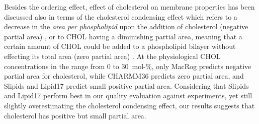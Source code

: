 \documentclass[journal=jctcce]{achemso}
\begin{document}
Besides the ordering effect, effect of cholesterol on membrane properties has been discussed also in terms of the cholesterol condensing effect which 
refers to a decrease in the \emph{area per phospholipid} upon the addition of cholesterol (negative partial area) \cite{edholm2005areas}, or to CHOL having a diminishing partial area, meaning that a certain amount of CHOL could be added to a phospholipid bilayer without effecting its total area (zero partial area) \cite{javanainen2017two}. 
At the physiological CHOL concentrations in the range from 0 to 30~mol-\%, only MacRog predicts negative partial area for cholesterol, while CHARMM36 predicts zero partial area, and Slipids and Lipid17 predict small positive partial area. Considering that Slipids and Lipid17 perform best in our quality evaluation against experiments, yet still slightly overestimating the cholesterol condensing effect, our results suggests that cholesterol has positive but small partial area.

\end{document}
